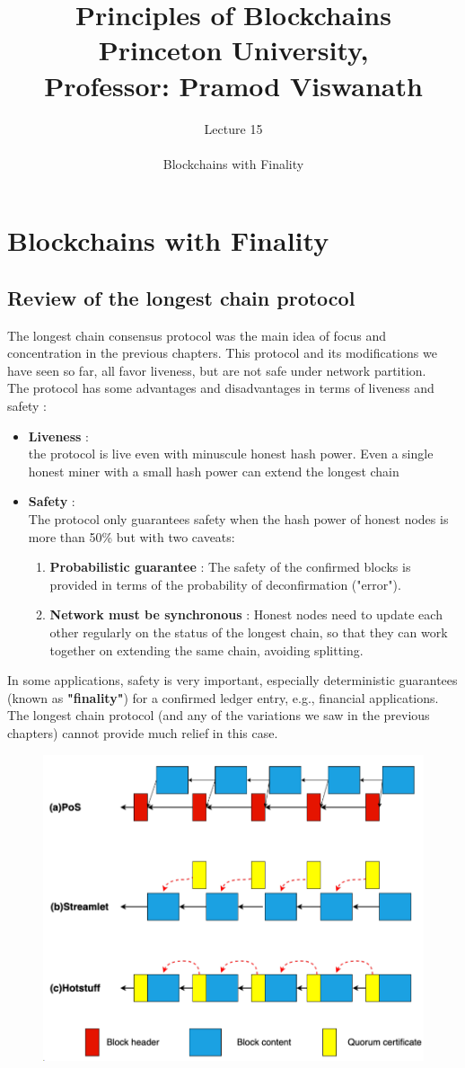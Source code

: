 \documentclass{report}
\title{\Huge{Principles of Blockchains \\ Princeton University,\\
		Professor: Pramod Viswanath}}
\author{\huge{Lecture 15} \\\\ Blockchains with Finality}
\begin{document}
\maketitle
\newpage%
\tableofcontents
\pagebreak

\chapter{Blockchains with Finality}
\section{Review of the longest chain protocol}
The longest chain consensus protocol was the main idea of focus and concentration in the previous chapters. This protocol and its modifications we have seen so far, all favor liveness, but are not safe under network partition.\\
The protocol has some advantages and disadvantages in terms of liveness and safety :
\begin{itemize}
	\item \textbf{Liveness} : \\
	the protocol is live even with minuscule honest hash power. Even a single honest miner with a small hash power can extend the longest chain
	\item \textbf{Safety} : \\
	The protocol only guarantees safety when the hash power of honest nodes is more than 50\% but with two caveats:
	\begin{enumerate}
		\item \textbf{Probabilistic guarantee} :
		The safety of the confirmed blocks is provided in terms of the probability of deconfirmation ("error").
		\item \textbf{Network must be synchronous} :
		Honest nodes need to update each other regularly on the status of the longest chain, so that they can work together on extending the same chain, avoiding splitting.
	\end{enumerate}
\end{itemize}
In some applications, safety is very important, especially deterministic guarantees (known as \textbf{"finality"}) for a confirmed ledger entry, e.g., financial applications. The longest chain protocol (and any of the variations we saw in the previous chapters) cannot provide much relief in this case.
\begin{figure}[h!]
	\centering
	\includegraphics[width=0.5\linewidth]{Fig/F8}
	\caption{}
	\label{fig:f8}
\end{figure}
\end{document}
